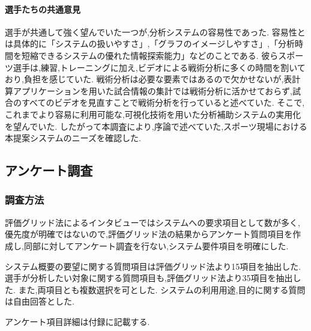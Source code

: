 \documentclass[sotsuron]{kuee}
\begin{document}
				\paragraph{選手たちの共通意見}
					選手が共通して強く望んでいた一つが,分析システムの容易性であった.
					容易性とは具体的に「システムの扱いやすさ」,「グラフのイメージしやすさ」,「分析時間を短縮できるシステムの優れた情報探索能力」などのことである.
					彼らスポーツ選手は,練習,トレーニングに加え,ビデオによる戦術分析に多くの時間を割いており,負担を感じていた.
					戦術分析は必要な要素ではあるので欠かせないが,表計算アプリケーションを用いた試合情報の集計では戦術分析に活かせておらず,試合のすべてのビデオを見直すことで戦術分析を行っていると述べていた.
					そこで,これまでより容易に利用可能な,可視化技術を用いた分析補助システムの実用化を望んでいた.
					したがって本調査により,序論で述べていた,スポーツ現場における本提案システムのニーズを確認した.
		\subsection{アンケート調査}
			\subsubsection{調査方法}
				評価グリッド法によるインタビューではシステムへの要求項目として数が多く,優先度が明確ではないので,評価グリッド法の結果からアンケート質問項目を作成し,同部に対してアンケート調査を行ない,システム要件項目を明確にした.
				
				システム概要の要望に関する質問項目は評価グリッド法より15項目を抽出した.
				選手が分析したい対象に関する質問項目も,評価グリッド法より35項目を抽出した.
				また,両項目とも複数選択を可とした.
				システムの利用用途,目的に関する質問は自由回答とした.
				
				アンケート項目詳細は付録に記載する.
\end{document}
